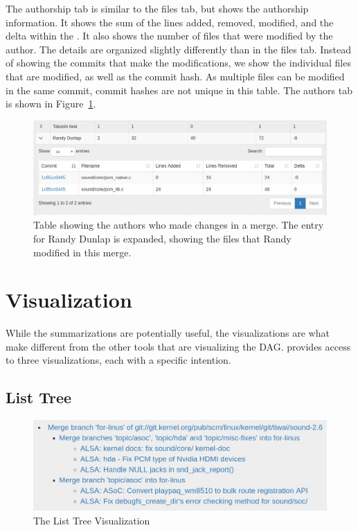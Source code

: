 The authorship tab is similar to the files tab, but shows the authorship
information. It shows the sum of the lines added, removed, modified, and
the delta within the \mt{}. It also shows the number of files that were
modified by the author. The details are organized slightly differently
than in the files tab. Instead of showing the commits that make the
modifications, we show the individual files that are modified, as well
as the commit hash. As multiple files can be modified in the same
commit, commit hashes are not unique in this table. The authors tab is
shown in Figure~\ref{fig:linvis_authors_results}.

\begin{figure}[htpb]
  \centering
  \includegraphics[width=0.9\linewidth]{Figures/Linvis/linvis_authors.png}
  \caption{Table showing the authors who made changes in a merge. The
    entry for Randy Dunlap is expanded, showing the files that Randy
    modified in this merge.}
  \label{fig:linvis_authors_results}
\end{figure}

\section{Visualization}\label{sec:visualization}

While the summarizations are potentially useful, the visualizations are
what make \tool{} different from the other tools that are visualizing
the DAG\@. \tool{} provides access to three visualizations, each with a
specific intention.

\subsection{List Tree}\label{sub:list_tree}

\begin{figure}[htpb]
  \centering
  \includegraphics[width=0.9\linewidth]{Figures/Linvis/linvis_list_tree.png}
  \caption{The List Tree Visualization}
  \label{fig:linvis_list_tree}
\end{figure}

